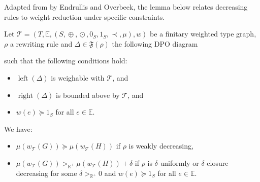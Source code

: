Adapted from \cite[Theorem C.3]{endrullis2024generalized_arxiv_v2} by Endrullis and Overbeek, the lemma below relates decreasing rules to weight reduction under specific constraints. 
\begin{lemma}
    \label{nwf:lem:decreasing_step}
    Let $\mathcal{T} \mathop{=} (T,\mathbb{E}, (S, \mathop{\oplus}, \mathop{\odot}, 0_S, 1_S, \prec, \mu), w)$ be a finitary weighted type graph, $\rho$ a rewriting rule and $\Delta \mathop{\in} \mathfrak{F}(\rho)$ the following DPO diagram
    \begin{center}
      \end{center}
    such that the following conditions hold:
 
   \begin{itemize}
       \item $\operatorname{left}(\Delta)$ is weighable with \(\mathcal{T}\), and
       \item $\operatorname{right}(\Delta)$ is bounded above by \(\mathcal{T}\), and
       \item $w(e) \mathop{\succeq} 1_S$ for all $e \mathop{\in} \mathbb{E}$.
   \end{itemize}

   \noindent
  We have:
   \begin{itemize}
       \item $\mu(w_\mathcal{T}(G)) \mathop{\succeq} \mu(w_\mathcal{T}(H))$ if $\rho$ is weakly decreasing,
       \item $\mu(w_\mathcal{T}(G)) >_{\mathbb{R}^+} \mu(w_\mathcal{T}(H))\mathop{+}\delta$ if $\rho$ is $\delta$-uniformly or $\delta$-closure decreasing for some $\delta >_{\mathbb{R}^+} 0$ and $w(e) \mathop{\succeq} 1_S$ for all $e \mathop{\in} \mathbb{E}$.
   \end{itemize}
\end{lemma} 

